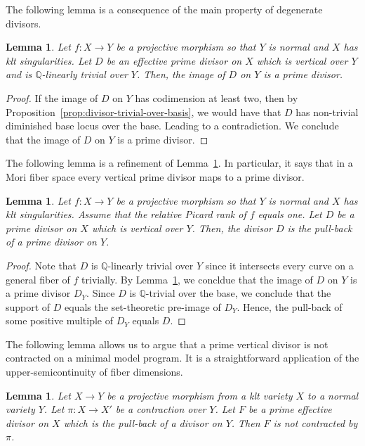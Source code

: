 \documentclass{amsart}
\renewcommand{\qq}{\mathbb{Q}}
\newtheorem{lemma}[theorem]{Lemma}
\theoremstyle{remark}
\numberwithin{equation}{section}
\begin{document}
The following lemma is a consequence of
the main property of degenerate divisors.

\begin{lemma}\label{lem:vert-div-Q-trivial}
Let $f\colon X\rightarrow Y$ be a projective morphism so that $Y$ is normal and $X$ has klt singularities.
Let $D$ be an effective prime divisor on $X$ which is vertical over $Y$
and is $\qq$-linearly trivial over $Y$.
Then, the image of $D$ on $Y$ is a prime divisor.
\end{lemma}

\begin{proof}
If the image of $D$ on $Y$ has codimension at least two, then by Proposition~\ref{prop:divisor-trivial-over-basis}, we would have that $D$ has non-trivial diminished base locus over the base.
Leading to a contradiction.
We conclude that the image of $D$ on $Y$ is a prime divisor.
\end{proof}

The following lemma is a refinement of Lemma~\ref{lem:vert-div-Q-trivial}.
In particular, it says that in a Mori fiber space
every vertical prime divisor maps to a prime divisor.

\begin{lemma}\label{lem:vert-div-MFS}
Let $f\colon X\rightarrow Y$ be a projective morphism so that $Y$ is normal and $X$ has klt singularities.
Assume that the relative Picard rank of $f$ equals one.
Let $D$ be a prime divisor on $X$ which is vertical over $Y$.
Then, the divisor $D$ is the pull-back of a prime divisor on $Y$.
\end{lemma}

\begin{proof}
Note that $D$ is $\qq$-linearly trivial over $Y$ since it intersects every curve on a general fiber of $f$ trivially.
By Lemma~\ref{lem:vert-div-Q-trivial}, we concldue that the image of $D$ on $Y$ is a prime divisor $D_Y$.
Since $D$ is $\qq$-trivial over the base, we conclude that the support of $D$ equals the set-theoretic pre-image of $D_Y$.
Hence, the pull-back of some positive multiple of $D_Y$ equals $D$.
\end{proof}

The following lemma allows us to argue that a prime vertical divisor is not contracted on a minimal model program.
It is a straightforward application of the upper-semicontinuity of fiber dimensions.

\begin{lemma}\label{lem:not-contracted-prime-vertical}
Let $X\rightarrow Y$ be a projective morphism from a klt variety $X$ to a normal variety $Y$.
Let $\pi\colon X\rightarrow X'$ be a contraction over $Y$.
Let $F$ be a prime effective divisor on $X$ which is the pull-back of a divisor on $Y$.
Then $F$ is not contracted by $\pi$.
\end{lemma}
\end{document}
